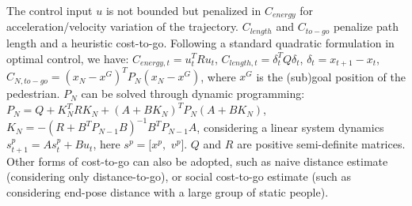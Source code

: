 \documentclass[conference]{IEEEtran}
\begin{document}
The control input $u$ is not bounded but 
penalized in $C_{energy}$ for acceleration/velocity variation of the trajectory. 
$C_{length}$ and $C_{to-go}$ penalize path length and a heuristic cost-to-go. 
Following a standard quadratic formulation in optimal control, we have: $C_{energy,t}=u_t^TRu_t$, 
$C_{length,t}=\delta_t^TQ\delta_t$, $\delta_t = x_{t+1}-x_t$, 
$C_{N,to-go} = (x_N-x^G)^TP_N(x_N-x^G)$, where $x^G$ is the (sub)goal 
position of the pedestrian. $P_N$ can be solved through dynamic programming:
$P_N = Q + K_N^TRK_N + (A+BK_N)^TP_N(A+BK_N)$, 
$K_N = -(R+B^TP_{N-1}B)^{-1}B^TP_{N-1}A$, considering a linear system dynamics
$s^p_{t+1}= As^p_t+Bu_t$, here $s^p = [x^p,$ $v^p]$. $Q$ and $R$ are positive 
semi-definite matrices. Other forms of cost-to-go can also be adopted, such as 
naive distance estimate (considering only distance-to-go), or social 
cost-to-go estimate (such as considering end-pose distance with a large group 
of static people).
\end{document}
